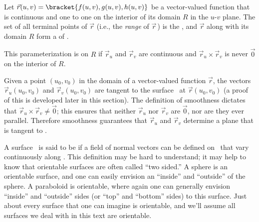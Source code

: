
\begin{definition}\label{def:parameterized_surface}
Let $\vec r(u,v) = \bracket{f(u,v),g(u,v),h(u,v)}$ be a vector-valued function that is continuous and one to one on the interior of its domain $R$ in the $u$-$v$ plane. The set of all terminal points of $\vec r$ (i.e., the \emph{range} of $\vec r$\,) is the  \surfaceS, and $\vec r$ along with its domain $R$ form a  of \surfaceS.%

This parameterization is  on $R$ if $\vec r_u$ and $\vec r_v$ are continuous and $\vec r_u\times \vec r_v$ is never $\vec 0$ on the interior of $R$.
\end{definition}

Given a point $(u_0,v_0)$ in the domain of a vector-valued function $\vec r$, the vectors $\vec r_u(u_0,v_0)$ and $\vec r_v(u_0,v_0)$ are tangent to the surface \surfaceS\ at $\vec r(u_0,v_0)$ (a proof of this is developed later in this section). The definition of smoothness dictates that $\vec r_u\times \vec r_v \neq \vec 0$; this ensures that neither $\vec r_u$ nor $\vec r_v$ are $\vec 0$, nor are they ever parallel. Therefore smoothness guarantees that $\vec r_u$ and $\vec r_v$ determine a plane that is tangent to \surfaceS.


A surface \surfaceS\ is said to be  if a field of normal vectors can be defined on \surfaceS\ that vary continuously along \surfaceS. This definition may be hard to understand; it may help to know that orientable surfaces are often called ``two sided.'' A sphere is an orientable surface, and one can easily envision an ``inside'' and ``outside'' of the sphere. A paraboloid is orientable, where again one can generally envision  ``inside'' and ``outside'' sides (or ``top'' and ``bottom'' sides) to this surface. Just about every surface that one can imagine is orientable, and we'll assume all surfaces we deal with in this text are orientable.

